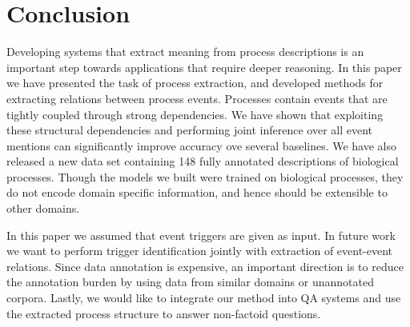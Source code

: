 \section{Conclusion}

Developing systems that extract meaning from process descriptions is an important step towards applications that require deeper reasoning. In this paper we have presented the task of process extraction, and developed methods for extracting relations between process events. Processes contain events that are  tightly coupled through strong dependencies. We have shown that  exploiting these structural dependencies and performing joint inference over all event mentions can significantly improve accuracy ove several baselines. We have also released a new data set containing 148 fully annotated descriptions of biological processes. Though the models we built were trained on biological processes, they do not encode domain specific information, and hence should be extensible to other domains.

In this paper we assumed that event triggers are given as input. In future work we want to perform trigger identification jointly with extraction of event-event relations. Since data annotation is expensive, an important direction is to reduce the annotation burden by using data from similar domains or unannotated corpora. Lastly, we would like to integrate our method into QA systems and use the extracted process structure to answer non-factoid questions. 
